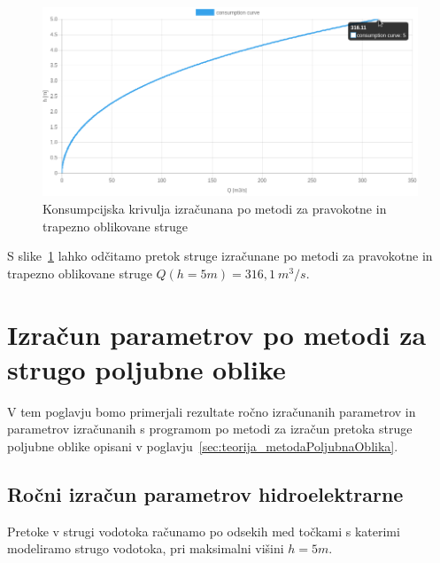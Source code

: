 \begin{figure}[H]
	\begin{centering}
		\includegraphics[width=\textwidth]{slike/izracuni/trapeznaMetoda_konsumpcijska.png}\caption{Konsumpcijska krivulja izračunana po metodi za pravokotne in trapezno oblikovane struge}\label{fig:trapeznaMetoda_konsumpcijskaKrivulja}
	\end{centering}
\end{figure}



S slike~\ref{fig:trapeznaMetoda_konsumpcijskaKrivulja} lahko odčitamo pretok struge izračunane po metodi za pravokotne in trapezno oblikovane struge $Q(h=5m) = 316,1~m^3/s$. 


\section{Izračun parametrov po metodi za strugo poljubne oblike}\label{sec:izracun_numericnaMetoda}

V tem poglavju bomo primerjali rezultate ročno izračunanih parametrov in parametrov izračunanih s programom po metodi za izračun pretoka struge poljubne oblike opisani v poglavju~\ref{sec:teorija_metodaPoljubnaOblika}.


\subsection{Ročni izračun parametrov hidroelektrarne}\label{sec:izracun_rocno_numericnaMetoda}

Pretoke v strugi vodotoka računamo po odsekih med točkami s katerimi modeliramo strugo vodotoka, pri maksimalni višini $h=5m$.



